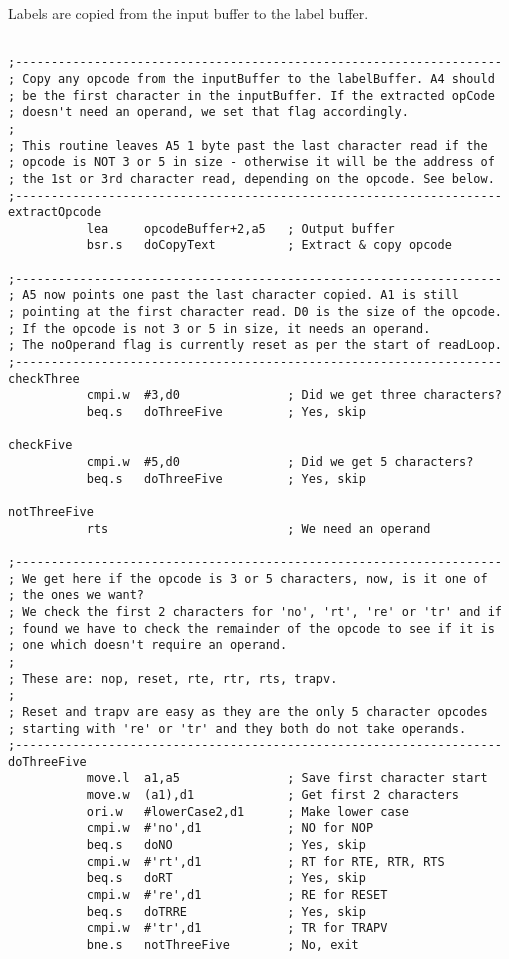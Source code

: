 Labels are copied from the input buffer to the label buffer.

\begin{lstlisting}[firstnumber=last,caption={ASMReformat Source - Extracting Opcodes}]

;--------------------------------------------------------------------
; Copy any opcode from the inputBuffer to the labelBuffer. A4 should
; be the first character in the inputBuffer. If the extracted opCode
; doesn't need an operand, we set that flag accordingly.
;
; This routine leaves A5 1 byte past the last character read if the
; opcode is NOT 3 or 5 in size - otherwise it will be the address of
; the 1st or 3rd character read, depending on the opcode. See below.
;--------------------------------------------------------------------
extractOpcode
           lea     opcodeBuffer+2,a5   ; Output buffer
           bsr.s   doCopyText          ; Extract & copy opcode

;--------------------------------------------------------------------
; A5 now points one past the last character copied. A1 is still 
; pointing at the first character read. D0 is the size of the opcode.
; If the opcode is not 3 or 5 in size, it needs an operand.
; The noOperand flag is currently reset as per the start of readLoop.
;--------------------------------------------------------------------
checkThree
           cmpi.w  #3,d0               ; Did we get three characters?
           beq.s   doThreeFive         ; Yes, skip

checkFive
           cmpi.w  #5,d0               ; Did we get 5 characters?
           beq.s   doThreeFive         ; Yes, skip

notThreeFive
           rts                         ; We need an operand

;--------------------------------------------------------------------
; We get here if the opcode is 3 or 5 characters, now, is it one of
; the ones we want?
; We check the first 2 characters for 'no', 'rt', 're' or 'tr' and if
; found we have to check the remainder of the opcode to see if it is
; one which doesn't require an operand.
;
; These are: nop, reset, rte, rtr, rts, trapv.
;
; Reset and trapv are easy as they are the only 5 character opcodes
; starting with 're' or 'tr' and they both do not take operands.
;--------------------------------------------------------------------
doThreeFive
           move.l  a1,a5               ; Save first character start
           move.w  (a1),d1             ; Get first 2 characters
           ori.w   #lowerCase2,d1      ; Make lower case
           cmpi.w  #'no',d1            ; NO for NOP
           beq.s   doNO                ; Yes, skip
           cmpi.w  #'rt',d1            ; RT for RTE, RTR, RTS
           beq.s   doRT                ; Yes, skip
           cmpi.w  #'re',d1            ; RE for RESET
           beq.s   doTRRE              ; Yes, skip
           cmpi.w  #'tr',d1            ; TR for TRAPV
           bne.s   notThreeFive        ; No, exit


\end{lstlisting}
